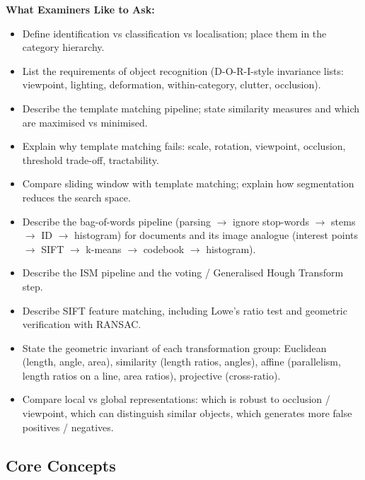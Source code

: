 \separator

\textbf{What Examiners Like to Ask:}
\begin{itemize}
  \item Define identification vs classification vs localisation; place them in the category hierarchy.
  \item List the requirements of object recognition (D-O-R-I-style invariance lists: viewpoint, lighting, deformation, within-category, clutter, occlusion).
  \item Describe the template matching pipeline; state similarity measures and which are maximised vs minimised.
  \item Explain why template matching fails: scale, rotation, viewpoint, occlusion, threshold trade-off, tractability.
  \item Compare sliding window with template matching; explain how segmentation reduces the search space.
  \item Describe the bag-of-words pipeline (parsing $\to$ ignore stop-words $\to$ stems $\to$ ID $\to$ histogram) for documents and its image analogue (interest points $\to$ SIFT $\to$ k-means $\to$ codebook $\to$ histogram).
  \item Describe the ISM pipeline and the voting / Generalised Hough Transform step.
  \item Describe SIFT feature matching, including Lowe's ratio test and geometric verification with RANSAC.
  \item State the geometric invariant of each transformation group: Euclidean (length, angle, area), similarity (length ratios, angles), affine (parallelism, length ratios on a line, area ratios), projective (cross-ratio).
  \item Compare local vs global representations: which is robust to occlusion / viewpoint, which can distinguish similar objects, which generates more false positives / negatives.
\end{itemize}

\subsection{Core Concepts}

